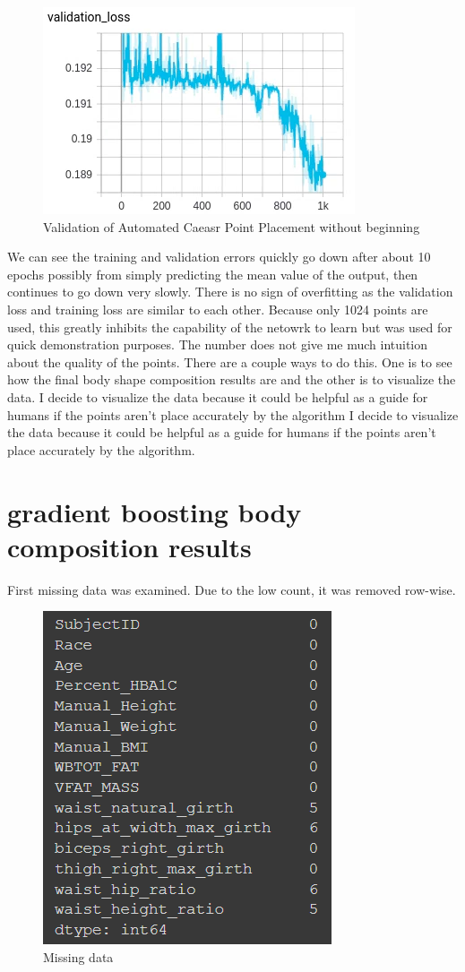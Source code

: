 \begin{figure}[h]
	\caption{Validation of Automated Caeasr Point Placement without beginning}
	\centering
\includegraphics{images/val_close.png}
\end{figure}

We can see the training and validation errors quickly go down after about 10 epochs possibly from simply predicting the mean value of the output, then continues to go down very slowly. There is no sign of overfitting as the validation loss and training loss are similar to each other. Because only 1024 points are used, this greatly inhibits the capability of the netowrk to learn but was used for quick demonstration purposes. The number does not give me much intuition about the quality of the points. There are a couple ways to do this. One is to see how the final body shape composition results are and the other is to visualize the data. I decide to visualize the data because it could be helpful as a guide for humans if the points aren't place accurately by the algorithm  I decide to visualize the data because it could be helpful as a guide for humans if the points aren't place accurately by the algorithm. 

\section{gradient boosting body composition results}

First missing data was examined. Due to the low count, it was removed row-wise.

\begin{figure}[h]
	\caption{Missing data}
	\centering
	\includegraphics[]{images/missing_data.png}
\end{figure}

